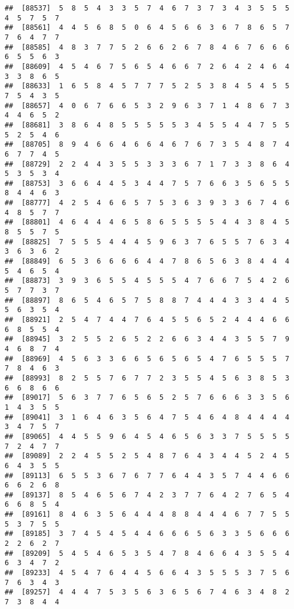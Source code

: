 \documentclass[
]{book}
\begin{document}
\begin{verbatim}
##  [88537]  5  8  5  4  3  3  5  7  4  6  7  3  7  3  4  3  5  5  5  4  5  7  5  7
##  [88561]  4  4  5  6  8  5  0  6  4  5  6  6  3  6  7  8  6  5  7  7  6  4  7  7
##  [88585]  4  8  3  7  7  5  2  6  6  2  6  7  8  4  6  7  6  6  6  6  5  5  6  3
##  [88609]  4  5  4  6  7  5  6  5  4  6  6  7  2  6  4  2  4  6  4  3  3  8  6  5
##  [88633]  1  6  5  8  4  5  7  7  7  5  2  5  3  8  4  5  4  5  5  7  5  4  3  5
##  [88657]  4  0  6  7  6  6  5  3  2  9  6  3  7  1  4  8  6  7  3  4  4  6  5  2
##  [88681]  3  8  6  4  8  5  5  5  5  5  3  4  5  5  4  4  7  5  5  5  2  5  4  6
##  [88705]  8  9  4  6  6  4  6  6  4  6  7  6  7  3  5  4  8  7  4  6  7  7  4  5
##  [88729]  2  2  4  4  3  5  5  3  3  3  6  7  1  7  3  3  8  6  4  5  3  5  3  4
##  [88753]  3  6  6  4  4  5  3  4  4  7  5  7  6  6  3  5  6  5  5  8  4  4  6  3
##  [88777]  4  2  5  4  6  6  5  7  5  3  6  3  9  3  3  6  7  4  6  4  8  5  7  7
##  [88801]  4  6  4  4  4  6  5  8  6  5  5  5  5  4  4  3  8  4  5  8  5  5  7  5
##  [88825]  7  5  5  5  4  4  4  5  9  6  3  7  6  5  5  7  6  3  4  3  6  3  6  2
##  [88849]  6  5  3  6  6  6  6  4  4  7  8  6  5  6  3  8  4  4  4  5  4  6  5  4
##  [88873]  3  9  3  6  5  5  4  5  5  5  4  7  6  6  7  5  4  2  6  5  7  7  3  7
##  [88897]  8  6  5  4  6  5  7  5  8  8  7  4  4  4  3  3  4  4  5  5  6  3  5  4
##  [88921]  2  5  4  7  4  4  7  6  4  5  5  6  5  2  4  4  4  6  6  6  8  5  5  4
##  [88945]  3  2  5  5  2  6  5  2  2  6  6  3  4  4  3  5  5  7  9  4  6  8  7  4
##  [88969]  4  5  6  3  3  6  6  5  6  5  6  5  4  7  6  5  5  5  7  7  8  4  6  3
##  [88993]  8  2  5  5  7  6  7  7  2  3  5  5  4  5  6  3  8  5  3  6  6  8  6  6
##  [89017]  5  6  3  7  7  6  5  6  5  2  5  7  6  6  6  3  3  5  6  1  4  3  5  5
##  [89041]  3  1  6  4  6  3  5  6  4  7  5  4  6  4  8  4  4  4  4  3  4  7  5  7
##  [89065]  4  4  5  5  9  6  4  5  4  6  5  6  3  3  7  5  5  5  5  7  2  4  7  7
##  [89089]  2  2  4  5  5  2  5  4  8  7  6  4  3  4  4  5  2  4  5  6  4  3  5  5
##  [89113]  6  5  5  3  6  7  6  7  7  6  4  4  3  5  7  4  4  6  6  6  6  2  6  8
##  [89137]  8  5  4  6  5  6  7  4  2  3  7  7  6  4  2  7  6  5  4  6  6  8  5  4
##  [89161]  8  4  6  3  5  6  4  4  4  8  8  4  4  4  6  7  7  5  5  5  3  7  5  5
##  [89185]  3  7  4  5  4  5  4  4  6  6  6  5  6  3  3  5  6  6  6  2  2  6  2  7
##  [89209]  5  4  5  4  6  5  3  5  4  7  8  4  6  6  4  3  5  5  4  6  3  4  7  2
##  [89233]  4  5  4  7  6  4  4  5  6  6  4  3  5  5  5  3  7  5  6  7  6  3  4  3
##  [89257]  4  4  4  7  5  3  5  6  3  6  5  6  7  4  6  3  4  8  2  7  3  8  4  4

\end{verbatim}
\end{document}
